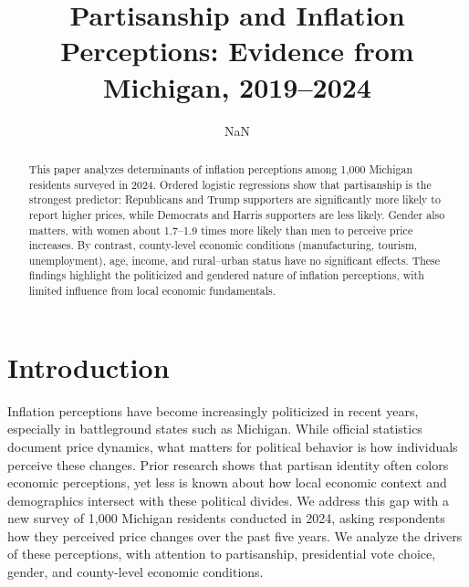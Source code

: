 \documentclass[preprint,12pt,authoryear]{elsarticle}
\begin{document}

\begin{frontmatter}

\title{Partisanship and Inflation Perceptions: Evidence from Michigan, 2019–2024}

\author[1]{NaN
}



\address[1]{NaN}




\begin{abstract}
This paper analyzes determinants of inflation perceptions among 1,000 Michigan residents surveyed in 2024. Ordered logistic regressions show that partisanship is the strongest predictor: Republicans and Trump supporters are significantly more likely to report higher prices, while Democrats and Harris supporters are less likely. Gender also matters, with women about 1.7–1.9 times more likely than men to perceive price increases. By contrast, county-level economic conditions (manufacturing, tourism, unemployment), age, income, and rural–urban status have no significant effects. These findings highlight the politicized and gendered nature of inflation perceptions, with limited influence from local economic fundamentals.
\end{abstract}


\begin{keyword}

\end{keyword}

\end{frontmatter}

\newpage


\section{Introduction}

Inflation perceptions have become increasingly politicized in recent years, especially in battleground states such as Michigan. While official statistics document price dynamics, what matters for political behavior is how individuals perceive these changes. Prior research shows that partisan identity often colors economic perceptions, yet less is known about how local economic context and demographics intersect with these political divides. We address this gap with a new survey of 1,000 Michigan residents conducted in 2024, asking respondents how they perceived price changes over the past five years. We analyze the drivers of these perceptions, with attention to partisanship, presidential vote choice, gender, and county-level economic conditions.
\newpage
\end{document}
